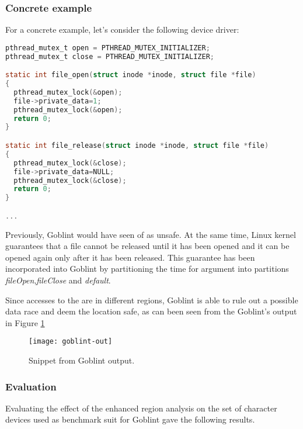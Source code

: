 \documentclass[..thesis.tex]{subfiles}
\begin{document}

\subsubsection{Concrete example}

For a concrete example, let's consider the following device driver:

\begin{lstlisting}[language=c,style=def,columns=fullflexible]
pthread_mutex_t open = PTHREAD_MUTEX_INITIALIZER;
pthread_mutex_t close = PTHREAD_MUTEX_INITIALIZER;

static int file_open(struct inode *inode, struct file *file)
{
  pthread_mutex_lock(&open);
  file->private_data=1; 
  pthread_mutex_lock(&open);
  return 0;
}

static int file_release(struct inode *inode, struct file *file)
{
  pthread_mutex_lock(&close);
  file->private_data=NULL; 
  pthread_mutex_lock(&close);
  return 0;
}

...
\end{lstlisting}

Previously, Goblint would have seen  of  as unsafe. At the same time, Linux kernel guarantees that a file cannot be released until it has been opened and it can be opened again only after it has been released. This guarantee has been incorporated into Goblint by partitioning the time for  argument into partitions \textit{fileOpen},\textit{fileClose} and \textit{default}. 

Since accesses to the  are in different regions, Goblint is able to rule out a possible data race and deem the location safe, as can been seen from the Goblint's output in Figure \ref{Goblint-example}

\begin{figure}[H]
\texttt{[image: goblint-out]}
\caption{Snippet from Goblint output.}
\label{Goblint-example}
\end{figure}
\subsubsection{Evaluation}

Evaluating the effect of the enhanced region analysis on the set of character devices used as benchmark suit for Goblint gave the following results.
\end{document}
